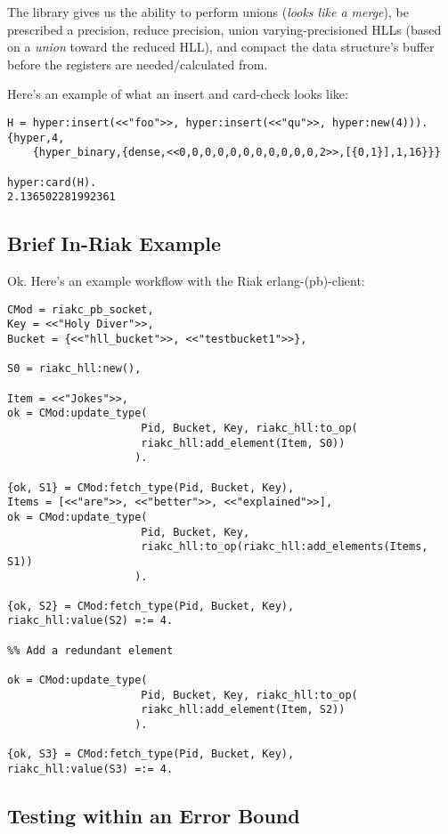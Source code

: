 \documentclass[12pt]{article}
\newlength\tindent
\renewcommand{\indent}{\hspace*{\tindent}}
\begin{document}
\indent The library gives us the ability to perform unions
(\textit{looks like a merge}), be prescribed a precision, reduce precision,
union varying-precisioned HLLs (based on a \textit{union} toward the reduced
HLL), and compact the data structure's buffer before the registers are
needed/calculated from.\newline

Here's an example of what an insert and card-check looks like:

\begin{lstlisting}
H = hyper:insert(<<"foo">>, hyper:insert(<<"qu">>, hyper:new(4))).
{hyper,4,
    {hyper_binary,{dense,<<0,0,0,0,0,0,0,0,0,0,0,2>>,[{0,1}],1,16}}}

hyper:card(H).
2.136502281992361
\end{lstlisting}

\subsection{Brief In-Riak Example}

Ok. Here's an example workflow with the Riak erlang-(pb)-client:

\begin{lstlisting}
CMod = riakc_pb_socket,
Key = <<"Holy Diver">>,
Bucket = {<<"hll_bucket">>, <<"testbucket1">>},

S0 = riakc_hll:new(),

Item = <<"Jokes">>,
ok = CMod:update_type(
                     Pid, Bucket, Key, riakc_hll:to_op(
                     riakc_hll:add_element(Item, S0))
                    ).

{ok, S1} = CMod:fetch_type(Pid, Bucket, Key),
Items = [<<"are">>, <<"better">>, <<"explained">>],
ok = CMod:update_type(
                     Pid, Bucket, Key,
                     riakc_hll:to_op(riakc_hll:add_elements(Items, S1))
                    ).

{ok, S2} = CMod:fetch_type(Pid, Bucket, Key),
riakc_hll:value(S2) =:= 4.

%% Add a redundant element

ok = CMod:update_type(
                     Pid, Bucket, Key, riakc_hll:to_op(
                     riakc_hll:add_element(Item, S2))
                    ).

{ok, S3} = CMod:fetch_type(Pid, Bucket, Key),
riakc_hll:value(S3) =:= 4.
\end{lstlisting}

\subsection{Testing within an Error Bound}
\end{document}
